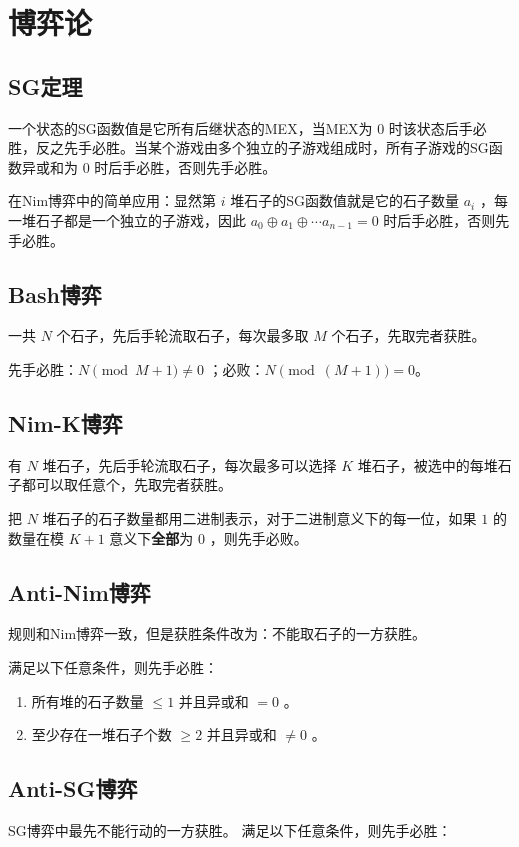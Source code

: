 \documentclass{article}
\begin{document}
\section{博弈论}
\subsection{SG定理}
一个状态的SG函数值是它所有后继状态的MEX，当MEX为 $0$ 时该状态后手必胜，反之先手必胜。当某个游戏由多个独立的子游戏组成时，所有子游戏的SG函数异或和为 $0$ 时后手必胜，否则先手必胜。

在Nim博弈中的简单应用：显然第 $i$ 堆石子的SG函数值就是它的石子数量 $a_i$ ，每一堆石子都是一个独立的子游戏，因此 $a_0\oplus a_1\oplus\cdots a_{n-1}=0$ 时后手必胜，否则先手必胜。

\subsection{Bash博弈}
一共 $N$ 个石子，先后手轮流取石子，每次最多取 $M$ 个石子，先取完者获胜。

先手必胜：$N \pmod{M+1} \neq 0$ ；必败：$N \pmod{(M+1)} = 0$。

\subsection{Nim-K博弈}
有 $N$ 堆石子，先后手轮流取石子，每次最多可以选择 $K$ 堆石子，被选中的每堆石子都可以取任意个，先取完者获胜。

把 $N$ 堆石子的石子数量都用二进制表示，对于二进制意义下的每一位，如果 $1$ 的数量在模 $K+1$ 意义下\textbf{全部}为 $0$ ，则先手必败。

\subsection{Anti-Nim博弈}
规则和Nim博弈一致，但是获胜条件改为：不能取石子的一方获胜。

满足以下任意条件，则先手必胜：

\begin{enumerate}
    \item 所有堆的石子数量 $\leq 1$ 并且异或和 $=0$ 。
    \item 至少存在一堆石子个数 $\geq 2$ 并且异或和 $\neq 0$ 。
\end{enumerate}

\subsection{Anti-SG博弈}
SG博弈中最先不能行动的一方获胜。
满足以下任意条件，则先手必胜：
\end{document}
